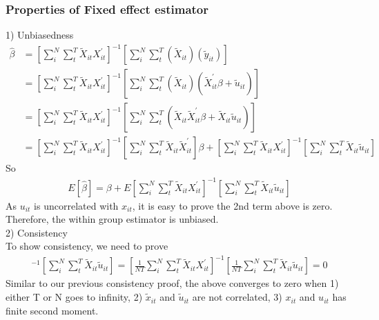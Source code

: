 \documentclass[a4paper]{article}
\begin{document}
\subsubsection {Properties of Fixed effect estimator}
1) Unbiasedness\\
\begin{align*}
\hat \beta & =  [\sum_i^N\sum_t^T\tilde X_{it}X_{it}^{'}]^{-1}[\sum_i^N\sum_t^T(\tilde X_{it})( \tilde y_{it})] \\
               & =  [\sum_i^N\sum_t^T\tilde X_{it} X_{it}^{'}]^{-1}[\sum_i^N\sum_t^T(\tilde X_{it})( \tilde X^{'}_{it}\beta + \tilde u_{it})] \\
              & =  [\sum_i^N\sum_t^T\tilde X_{it} X_{it}^{'}]^{-1}[\sum_i^N\sum_t^T(\tilde X_{it} \tilde X^{'}_{it}\beta + \tilde X_{it}\tilde u_{it})]\\
              & = [\sum_i^N\sum_t^T\tilde X_{it} X_{it}^{'}]^{-1}[\sum_i^N\sum_t^T \tilde X_{it} \tilde X^{'}_{it}]\beta 
                   + [\sum_i^N\sum_t^T\tilde X_{it} X_{it}^{'}]^{-1} [\sum_i^N \sum_t^T\tilde X_{it}\tilde u_{it}]
\end{align*}
So 
\begin{align*}
E[\hat \beta] = \beta + E[\sum_i^N\sum_t^T\tilde X_{it} X_{it}^{'}]^{-1} [\sum_i^N \sum_t^T \tilde X_{it}\tilde u_{it}]
\end{align*}
As $u_{it}$ is uncorrelated with $x_{it}$, it is easy to prove the 2nd term above is zero. Therefore, the within group estimator is unbiased.\\
2) Consistency\\
To show consistency, we need to prove
\begin{align*}
[\sum_i^N\sum_t^T\tilde X_{it} X_{it}^{'}]^{-1} [\sum_i^N \sum_t^T\tilde X_{it}\tilde u_{it}] 
= [\frac{1}{NT}\sum_i^N\sum_t^T\tilde X_{it} X_{it}^{'}]^{-1} [\frac{1}{NT}\sum_i^N \sum_t^T\tilde X_{it}\tilde u_{it}]  = 0 
\end{align*}
Similar to our previous consistency proof, the above converges to zero when 1) either T or N goes to infinity, 2) $\tilde x_{it}$ and $\tilde u_{it}$ are not correlated, 3) $x_{it}$ and $u_{it} $ has finite second moment.\\
\end{document}
